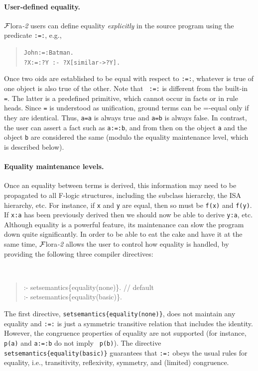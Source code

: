 \documentclass[11pt]{article}
\newcommand{\FLSYSTEM}{{\mbox{\sc ${\cal F}${lora}\rm\emph{-2}}}\xspace}
\newcommand{\fl}{\mbox{F-logic}\xspace}
\begin{document}
\paragraph{User-defined equality.}
\FLSYSTEM users can define equality \emph{explicitly} in the source
program using the predicate {\tt :=:}, e.g.,
\begin{quote}
{\tt John:=:Batman.} \\
{\tt ?X:=:?Y :- ?X[similar->?Y].} \\
\end{quote}
Once two oids are established to be equal with respect to {\tt :=:},
whatever is true of one object is also true of the other. Note that {\tt
  :=:} is different from the built-in {\tt =}. The latter is a predefined
primitive, which cannot occur in facts or in rule heads.  
Since {\tt =} is understood as unification, ground terms can be 
  =-equal only if they are identical. Thus, {\tt a=a} is always true and
{\tt a=b} is always false. In contrast, the user can assert a fact such as
{\tt a:=:b}, and from then on the object {\tt a} and the object {\tt b} are
considered the same (modulo the equality maintenance level, which is
described below).       

\paragraph{Equality maintenance levels.}
Once an equality between terms is derived, this information may need to be
propagated to all \fl 
structures, including the subclass hierarchy, the ISA hierarchy, etc.
For instance, if {\tt x} and {\tt y} are equal, then so must be {\tt f(x)}
and {\tt f(y)}. If {\tt x:a} has been previously derived then we should now
be able to derive {\tt y:a}, etc. Although equality is a powerful
feature, its maintenance can slow the program down quite significantly.
In order to be able to eat the cake and have it at the same time, \FLSYSTEM
allows the user to control how equality is handled,
by providing the following three compiler directives:
{\tt
\begin{quote}
:- setsemantics\{equality(none)\}.  // default\\
:- setsemantics\{equality(basic)\}.
\end{quote}
}

\noindent
The first directive, \mbox{\tt setsemantics\{equality(none)\}}, does not
maintain any equality and {\tt :=:} is just a symmetric transitive relation
that includes the identity. However,
the congruence properties of equality are not
supported (for instance, {\tt p(a)} and {\tt a:=:b} do not imply {\tt
  p(b)}). The directive
\mbox{\tt setsemantics\{equality(basic)\}} guarantees that {\tt :=:} obeys the
usual rules for equality, i.e., transitivity, reflexivity,
symmetry, and (limited) congruence.
\end{document}
